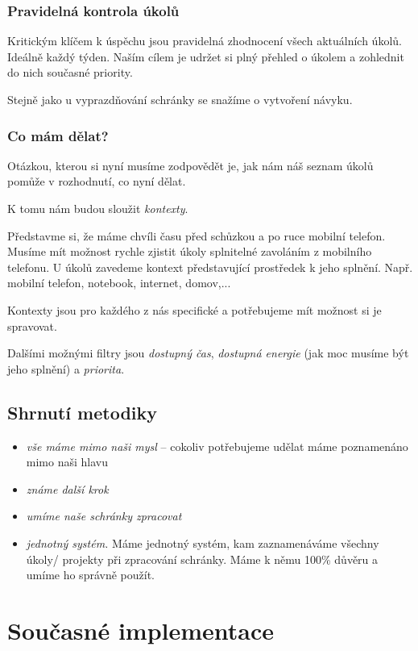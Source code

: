 \documentclass[thesis=B,czech]{FITthesis}[2012/06/26]
\begin{document}
\subsubsection{Pravidelná kontrola úkolů}

Kritickým klíčem k úspěchu jsou pravidelná zhodnocení všech aktuálních úkolů. Ideálně každý týden. Naším cílem je udržet si plný přehled o úkolem a zohlednit do nich současné priority.

Stejně jako u vyprazdňování schránky se snažíme o vytvoření návyku.

\subsubsection{Co mám dělat?}

Otázkou, kterou si nyní musíme zodpovědět je, jak nám náš seznam úkolů pomůže v rozhodnutí, co nyní dělat.

K tomu nám budou sloužit \textit{kontexty}.

Představme si, že máme chvíli času před schůzkou a po ruce mobilní telefon. Musíme mít možnost rychle zjistit úkoly splnitelné zavoláním z mobilního telefonu. U úkolů zavedeme kontext představující prostředek k jeho splnění. Např. mobilní telefon, notebook, internet, domov,...

Kontexty jsou pro každého z nás specifické a potřebujeme mít možnost si je spravovat.

Dalšími možnými filtry jsou \textit{dostupný čas}, \textit{dostupná energie} (jak moc  musíme být jeho splnění) a \textit{priorita}.

\subsection{Shrnutí metodiky}

\begin{itemize}
	\item \textit{vše máme mimo naši mysl} --
	cokoliv potřebujeme udělat máme poznamenáno mimo naši hlavu 
	\item \textit{známe další krok}
	\item \textit{umíme naše schránky zpracovat}
	\item \textit{jednotný systém.}
	Máme jednotný systém, kam zaznamenáváme všechny úkoly/ projekty při zpracování schránky. Máme k němu 100\% důvěru a umíme ho správně použít.	
\end{itemize}


\section{Současné implementace}
\end{document}

